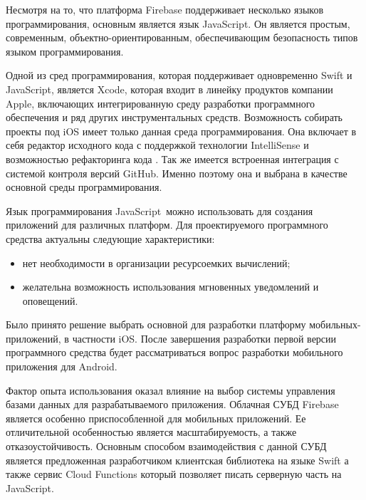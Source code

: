 Несмотря на то, что платформа Firebase поддерживает несколько языков программирования, основным является язык JavaScript. Он является простым, современным, объектно-ориентированным, обеспечивающим безопасность типов языком программирования.

Одной из сред программирования, которая поддерживает одновременно Swift и JavaScript, является Xcode, которая входит в линейку продуктов компании Apple, включающих интегрированную среду разработки программного обеспечения и ряд других инструментальных средств. Возможность собирать проекты под iOS имеет только данная среда программирования. Она включает в себя редактор исходного кода с поддержкой технологии In\-tel\-li\-Sen\-se и возможностью рефакторинга кода \cite{xcode_info}. Так же имеется встроенная интеграция с системой контроля версий GitHub. Именно поэтому она и выбрана в качестве основной среды программирования.

Язык программирования JavaScript~можно использовать для создания приложений для различных платформ. Для проектируемого программного сре\-д\-с\-т\-ва актуальны следующие характеристики:
\begin{itemize}
  \item нет необходимости в организации ресурсоемких вычислений;
  \item желательна возможность использования мгновенных уведомлений и оповещений.
\end{itemize}

Было принято решение выбрать основной для разработки платформу мобильных-приложений, в частности iOS. После завершения разработки первой версии программного средства будет рассматриваться вопрос разработки мобильного приложения для Android.

Фактор опыта использования оказал влияние на выбор  системы управления базами данных для разрабатываемого приложения. Облачная СУБД Firebase является особенно приспособленной для мобильных приложений. Ее отличительной особенностью является масштабируемость, а также отказоустойчивость. Основным способом взаимодействия с данной СУБД является предложенная разработчиком клиентская библиотека на языке Swift а также сервис Cloud Functions который позволяет писать серверную часть на JavaScript.